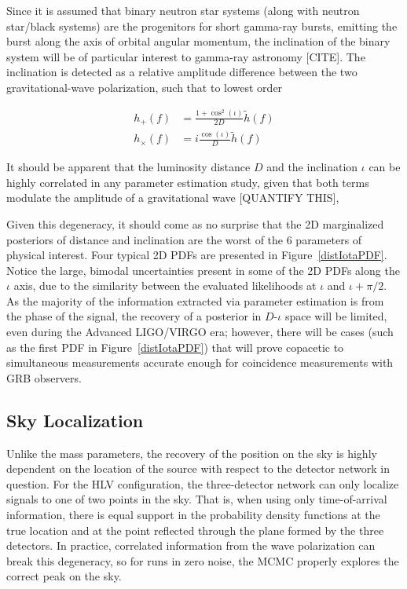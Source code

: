 \documentclass[11pt,a4paper]{emulateapj}
\newcommand{\carl}[1]{{\color{red}  #1}}
\begin{document}
Since it is assumed that binary neutron star systems (along with neutron star/black systems) are the progenitors for short gamma-ray bursts, emitting the burst along the axis of orbital angular momentum, the inclination of the binary system will be of particular interest to gamma-ray astronomy \carl{[CITE]}.  The inclination is detected as a relative amplitude difference between the two gravitational-wave polarization, such that to lowest order

\begin{align}
h_+(f) &= \frac{1+\cos^2(\iota)}{2 D} \tilde{h}(f) \nonumber \\
h_\times(f) &= i \frac{\cos(\iota)}{D}\tilde{h}(f)
\end{align}

\noindent It should be apparent that the luminosity distance $D$ and the inclination $\iota$ can be highly correlated in any parameter estimation study, given that both terms modulate the amplitude of a gravitational wave \carl{[QUANTIFY THIS]}, 

Given this degeneracy, it should come as no surprise that the 2D marginalized posteriors of distance and inclination are the worst of the 6 
parameters of physical interest.  Four typical 2D PDFs are presented in Figure~\ref{distIotaPDF}.  Notice the large, bimodal uncertainties 
present in some of the 2D PDFs along the $\iota$ axis, due to the similarity between the evaluated likelihoods at $\iota$ and $\iota + \pi/2$. 
 As the majority of the information extracted via parameter estimation is from the phase of the signal, the recovery of a posterior in $D$-$\iota$
 space will be limited, even during the Advanced LIGO/VIRGO era; however, there will be cases (such as the first PDF in Figure~\ref{distIotaPDF}) 
 that will prove copacetic to simultaneous measurements accurate enough for coincidence measurements with GRB observers.


\subsection{Sky Localization}
\label{skySection}
 
Unlike the mass parameters, the recovery of the position on the sky is highly dependent 
on the location of the source with respect to the detector network in question. 
For the HLV configuration, the three-detector network can only localize signals to one of
two points in the sky.  That is, when using only time-of-arrival information, there is 
equal support in the probability density functions at the true location and at the 
point reflected through the plane formed by the three detectors.  In practice, 
correlated information from the wave polarization can break this degeneracy, so for runs in 
zero noise, the MCMC properly explores the correct peak on the sky.
\end{document}
